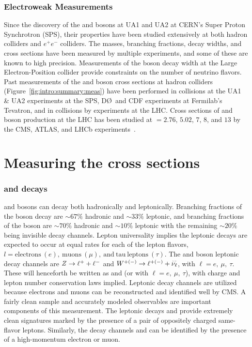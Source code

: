 \subsubsection{Electroweak Measurements}
Since the discovery of the \W and \Z bosons at UA1 and UA2 at CERN's Super Proton Synchrotron (SPS), their properties have been studied extensively at both hadron colliders and $e^+e^-$ colliders. The masses, branching fractions,  decay widths, and cross sections have been measured by multiple experiments, and some of these are known to high precision\cite{PhysRevD.98.030001}. Measurements of the \Z boson decay width at the Large Electron-Position collider provide constraints on the number of neutrino flavors\cite{ALEPH:2005ab}. 
Past measurements of the \W and \Z boson cross sections at hadron colliders (Figure~\ref{fig:intro:summary:meas}) have been performed in \ppbar collisions at the UA1 \& UA2 experiments at the SPS, D\O ~and CDF experiments at Fermilab's Tevatron, and in \pp collisions by experiments at the LHC. 
Cross sections of \Wpm and \Z boson production at the LHC has been studied at \s $= 2.76$, $5.02$, $7$, $8$, and $13$ \TeV by the CMS, ATLAS, and LHCb experiments~\cite{Aad:2019bdc,Aaboud:2018nic,Aaboud:2016btc,CMS:2011aa,Aaij:2014wba,Aaij:2012mda,Aaij:2015gna,Aaij:2016qqz,Aaij:2016mgv,Aaij:2015zlq,Chatrchyan:2014mua,Aad:2016naf}. 



\section{Measuring the cross sections}
\subsubsection{\W and \Z decays}
\W and \Z bosons can decay both hadronically and leptonically. Branching fractions of the \W boson decay are $\sim67\%$ hadronic and $\sim33\%$ leptonic, and branching fractions of the \Z boson are $\sim70\%$ hadronic and $\sim10\%$ leptonic with the remaining $\sim 20\%$ being invisible decay channels\cite{PhysRevD.98.030001}. Lepton universality implies the leptonic decays are expected to occur at equal rates for each of the lepton flavors, $l=\mathrm{electrons}~ (e),~\mathrm{muons}~(\mu),~\mathrm{and~tau~leptons}~ (\tau)$. The \W and \Z boson leptonic decay channels are $Z \to \ell^+ + \ell^-$ and $\W^{+(-)} \to \ell^{+(-)} +  \overset{\textbf{\fontsize{2pt}{2pt}\selectfont(---)}}{\nu_\ell}$, with $\ell=e,~\mu,~\tau$. These will henceforth be written as \zll and \wlnu (or with $\ell=e,~\mu,~\tau$), with charge and lepton number conservation laws implied.
Leptonic decay channels are utilized because electrons and muons can be reconstructed and identified well by CMS. A fairly clean sample and accurately modeled observables are important components of this measurement. The leptonic decays \zee and \zmm provide extremely clean signatures marked by the presence of a pair of oppositely charged same-flavor leptons. Similarly, the decay channels \wenu and \wmunu can be identified by the presence of a high-momentum electron or muon. 
